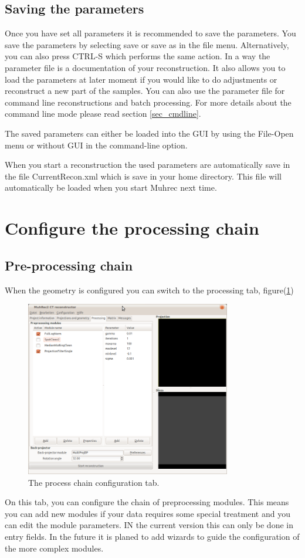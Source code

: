 \documentclass[a4paper]{scrreprt}
\begin{document}
\subsection{Saving the parameters}
Once you have set all parameters it is recommended to save the parameters.
You save the parameters by selecting save or save as in the file menu.
Alternatively, you can also press CTRL-S which performs the same action. In a
way the parameter file is a documentation of your reconstruction. It also allows
you to load the parameters at later moment if you would like to do adjustments
or reconstruct a new part of the samples. You can also use the parameter file
for command line reconstructions and batch processing. For more details about
the command line mode please read section \ref{sec_cmdline}.

The saved parameters can either be loaded into the GUI by using the File-Open
menu or without GUI in the command-line option.

When you start a reconstruction the used parameters are automatically save in
the file CurrentRecon.xml which is save in your home directory. This file will
automatically be loaded when you start Muhrec next time.

\section{Configure the processing chain}
\subsection{Pre-processing chain}
When the geometry is configured you can switch to the processing tab,
figure(\ref{fig_processtab})
\begin{figure}
 \centering
\includegraphics[width=0.8\textwidth]{figures/ProcessingTab.png}
\caption{The process chain configuration tab.}\label{fig_processtab}
\end{figure}
On this tab, you can configure the chain of preprocessing modules. This means
you can add new modules if your data requires some special treatment and you
can edit the module parameters. IN the current version this can only be done in
entry fields. In the future it is planed to add wizards to guide the
configuration of the more complex modules.
\end{document}
